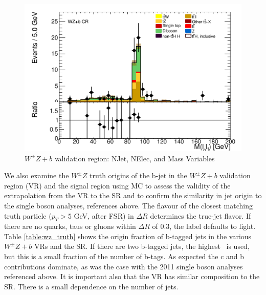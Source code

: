 \begin{figure}[!htbp]
\begin{minipage}[h]{0.5\textwidth}
  \end{minipage}\hfill
  \begin{minipage}[h]{0.5\textwidth}
    \centering \includegraphics[width=\textwidth]{figs/WZ/standardCR_3l_WZ_MT_1b_Mll01_thesis}
  \end{minipage}\hfill
\caption{$W^{\pm}Z+b$ validation region: NJet, NElec, and Mass Variables} 
\label{figure:background_wz_z_b}
\end{figure} 

We also examine the $W^{\pm}Z$ truth origins of the b-jet in the $W^{\pm}Z+b$ validation region (VR) and the signal region using MC to assess the validity of the extrapolation from the VR to the SR and to confirm the similarity in jet origin to the single boson analyses, references above. The flavour of the closest matching truth particle ($p_T > 5$ GeV, after FSR) in $\Delta R$ determines the true-jet flavor. If there are no quarks, taus or gluons within $\Delta R$ of 0.3, the label defaults to light.  Table \ref{table:wz_truth} shows the origin fraction of b-tagged jets in the various $W^{\pm}Z+b$ VRs and the SR. If there are two b-tagged jets, the highest \pt\ is used, but this is a small fraction of the number of b-tags. As expected the c and b contributions dominate, as was the case with the 2011 single boson analyses referenced above. It is important also that the VR has similar composition to the SR.  There is a small dependence on the number of jets. 

